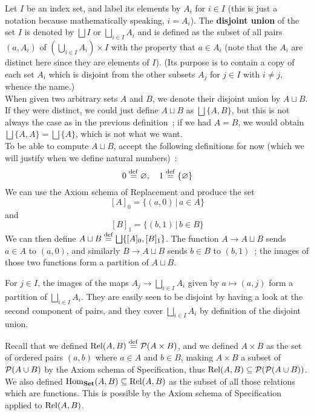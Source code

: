 \begin{definition} \label{disjoint-union}
    Let $I$ be an index set, and label its elements by $A_i$ for $i \in I$ (this is just a notation because mathematically speaking, $i=A_i$). The \textbf{disjoint union} of the set $I$ is denoted by $\bigsqcup I$ or $\bigsqcup_{i \in I} A_i$ and is defined as the subset of all pairs $(a,A_i)$ of $\left( \bigcup_{i \in I} A_i \right) \times I$ with the property that $a \in A_i$ (note that the $A_i$ are distinct here since they are elements of $I$). (Its purpose is to contain a copy of each set $A_i$ which is disjoint from the other subsets $A_j$ for $j \in I$ with $i \neq j$, whence the name.)
    \\

    When given two arbitrary sets $A$ and $B$, we denote their disjoint union by $A \sqcup B$. If they were distinct, we could just define $A \sqcup B$ as $\bigsqcup \{A,B\}$, but this is not always the case as in the previous definition~; if we had $A = B$, we would obtain $\bigsqcup \{A,A\} = \bigsqcup \{A\}$, which is not what we want. 
    \\
    
    To be able to compute $A \sqcup B$, accept the following definitions for now (which we will justify when we define natural numbers)~:
    \[
        0 \overset{\mathrm{def}}{=} \varnothing, \quad 1 \overset{\mathrm{def}}{=} \{ \varnothing \}   
    \]
    We can use the Axiom schema of Replacement and produce the set
    \[
        [A]_0 = \{ (a,0) \, | \, a \in A \}    
    \] 
    and
    \[
        [B]_1 = \{ (b,1) \, | \, b \in B \}    
    \]
    We can then define $A \sqcup B \overset{\mathrm{def}}{=} \bigsqcup \{[A]_0,[B]_1\}$. The function $A \to A \sqcup B$ sends $a \in A$ to $(a,0)$, and similarly $B \to A \sqcup B$ sends $b \in B$ to $(b, 1)$~; the images of those two functions form a partition of $A \sqcup B$. 
\end{definition}

\begin{remark}
    For $j \in I$, the images of the maps $A_j \to \bigsqcup_{i \in I} A_i$ given by $a \mapsto (a,j)$ form a partition of $\bigsqcup_{i \in I} A_i$. They are easily seen to be disjoint by having a look at the second component of pairs, and they cover $\bigsqcup_{i \in I} A_i$ by definition of the disjoint union.
\end{remark}

\begin{example} \label{hom-sets}
    Recall that we defined $\mathrm{Rel}(A,B) \overset{\mathrm{def}}{=} \operatorname{\mathcal P}(A \times B)$, and we defined $A \times B$ as the set of ordered pairs $(a,b)$ where $a \in A$ and $b \in B$, making $A \times B$ a subset of $\operatorname{\mathcal P}(A \cup B)$ by the Axiom schema of Specification, thus $\mathrm{Rel}(A,B) \subseteq \operatorname{\mathcal P}(\operatorname{\mathcal P}(A \cup B))$. 
    \\

    We also defined $\mathrm{Hom}_{\mathbf{Set}}(A,B) \subseteq \mathrm{Rel}(A,B)$ as the subset of all those relations which are functions. This is possible by the Axiom schema of Specification applied to $\mathrm{Rel}(A,B)$. 

\end{example}

